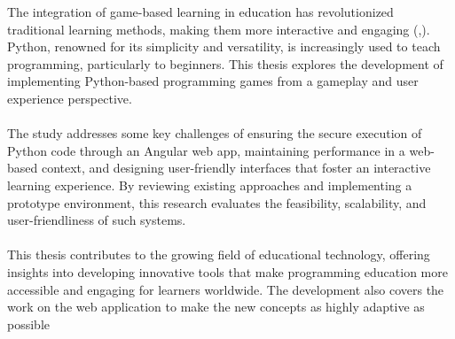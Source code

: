 The integration of game-based learning in education has revolutionized traditional learning methods, making them more interactive and engaging (\cite{prensky2003digital},\cite{tobias2014game}). Python, renowned for its simplicity and versatility, is increasingly used to teach programming, particularly to beginners. This thesis explores the development of implementing Python-based programming games from a gameplay and user experience perspective.
\\\\
The study addresses some key challenges of ensuring the secure execution of Python code through an Angular web app, maintaining performance in a web-based context, and designing user-friendly interfaces that foster an interactive learning experience. By reviewing existing approaches and implementing a prototype environment, this research evaluates the feasibility, scalability, and user-friendliness of such systems.
\\\\
This thesis contributes to the growing field of educational technology, offering insights into developing innovative tools that make programming education more accessible and engaging for learners worldwide. The development also covers the work on the web application to make the new concepts as highly adaptive as possible
